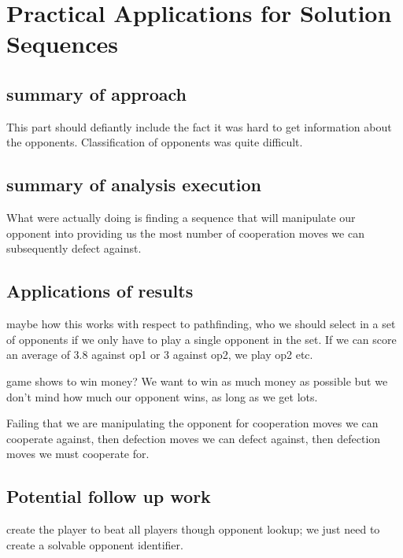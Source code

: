 \chapter{Practical Applications for Solution Sequences}\label{ch:conclusions}

\section{summary of approach}
This part should defiantly include the fact it was hard to get information about the opponents.
Classification of opponents was quite difficult.

\section{summary of analysis execution}
What were actually doing is finding a sequence that will manipulate our opponent into providing us the most number of cooperation moves we can subsequently defect against.

\section{Applications of results}
maybe how this works with respect to pathfinding, who we should select in a set of opponents if we only have to play a single opponent in the set.
If we can score an average of 3.8 against op1 or 3 against op2, we play op2 etc.

game shows to win money?
We want to win as much money as possible but we don't mind how much our opponent wins, as long as we get lots.

Failing that we are manipulating the opponent for cooperation moves we can cooperate against, then defection moves we can defect against, then defection moves we must cooperate for.

\section{Potential follow up work}
create the player to beat all players though opponent lookup; we just need to create a solvable opponent identifier. 
